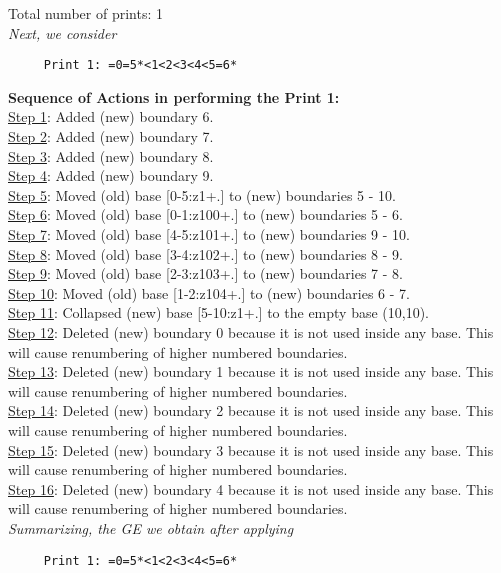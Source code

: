 \documentclass[final]{article}
\begin{document}
Total number of prints: 1\\
{\em Next, we consider}
\begin{verbatim}
     Print 1: =0=5*<1<2<3<4<5=6*
\end{verbatim}
{\bf Sequence of Actions in performing the Print 1:}\\
{\underline{Step 1}:} Added (new) boundary 6.\\
{\underline{Step 2}:} Added (new) boundary 7.\\
{\underline{Step 3}:} Added (new) boundary 8.\\
{\underline{Step 4}:} Added (new) boundary 9.\\
{\underline{Step 5}:} Moved (old) base [0-5:z1+.]  to (new) boundaries 5 - 10.\\
{\underline{Step 6}:} Moved (old) base [0-1:z100+.]  to (new) boundaries 5 - 6.\\
{\underline{Step 7}:} Moved (old) base [4-5:z101+.]  to (new) boundaries 9 - 10.\\
{\underline{Step 8}:} Moved (old) base [3-4:z102+.]  to (new) boundaries 8 - 9.\\
{\underline{Step 9}:} Moved (old) base [2-3:z103+.]  to (new) boundaries 7 - 8.\\
{\underline{Step 10}:} Moved (old) base [1-2:z104+.]  to (new) boundaries 6 - 7.\\
{\underline{Step 11}:} Collapsed (new) base [5-10:z1+.]  to the empty base (10,10).
\\
{\underline{Step 12}:} Deleted (new) boundary 0 because it is not used inside any base.  This will cause renumbering of higher numbered boundaries.
\\
{\underline{Step 13}:} Deleted (new) boundary 1 because it is not used inside any base.  This will cause renumbering of higher numbered boundaries.
\\
{\underline{Step 14}:} Deleted (new) boundary 2 because it is not used inside any base.  This will cause renumbering of higher numbered boundaries.
\\
{\underline{Step 15}:} Deleted (new) boundary 3 because it is not used inside any base.  This will cause renumbering of higher numbered boundaries.
\\
{\underline{Step 16}:} Deleted (new) boundary 4 because it is not used inside any base.  This will cause renumbering of higher numbered boundaries.
\\[0.1in]
{\em Summarizing, the GE we obtain after applying}
\begin{verbatim}
     Print 1: =0=5*<1<2<3<4<5=6*
\end{verbatim}
\end{document}
